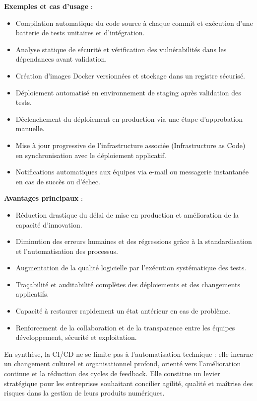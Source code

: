 \textbf{Exemples et cas d’usage} :
\begin{itemize}
	\item Compilation automatique du code source à chaque commit et exécution d’une batterie de tests unitaires et d’intégration.
	\item Analyse statique de sécurité et vérification des vulnérabilités dans les dépendances avant validation.
	\item Création d’images Docker versionnées et stockage dans un registre sécurisé.
	\item Déploiement automatisé en environnement de staging après validation des tests.
	\item Déclenchement du déploiement en production via une étape d’approbation manuelle.
	\item Mise à jour progressive de l’infrastructure associée (Infrastructure as Code) en synchronisation avec le déploiement applicatif.
	\item Notifications automatiques aux équipes via e-mail ou messagerie instantanée en cas de succès ou d’échec.
\end{itemize}

\textbf{Avantages principaux} :
\begin{itemize}
	\item Réduction drastique du délai de mise en production et amélioration de la capacité d’innovation.
	\item Diminution des erreurs humaines et des régressions grâce à la standardisation et l’automatisation des processus.
	\item Augmentation de la qualité logicielle par l’exécution systématique des tests.
	\item Traçabilité et auditabilité complètes des déploiements et des changements applicatifs.
	\item Capacité à restaurer rapidement un état antérieur en cas de problème.
	\item Renforcement de la collaboration et de la transparence entre les équipes développement, sécurité et exploitation.
\end{itemize}

En synthèse, la CI/CD ne se limite pas à l’automatisation technique : elle incarne un changement culturel et organisationnel profond, orienté vers l’amélioration continue et la réduction des cycles de feedback. Elle constitue un levier stratégique pour les entreprises souhaitant concilier agilité, qualité et maîtrise des risques dans la gestion de leurs produits numériques.


